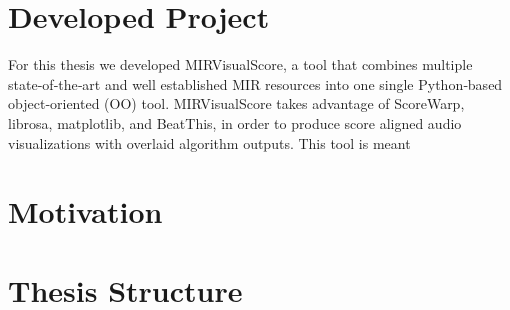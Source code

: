 
\section{Developed Project} \label{sec:proj}
For this thesis we developed MIRVisualScore, a tool that combines multiple state‑of‑the‑art and well established MIR resources into one single Python‑based object‑oriented (OO) tool. MIRVisualScore takes advantage of ScoreWarp, librosa, matplotlib, and BeatThis, in order to produce score aligned audio visualizations with overlaid algorithm outputs. This tool is meant 

\section{Motivation} \label{sec:goals}


\section{Thesis Structure} \label{sec:struct}

